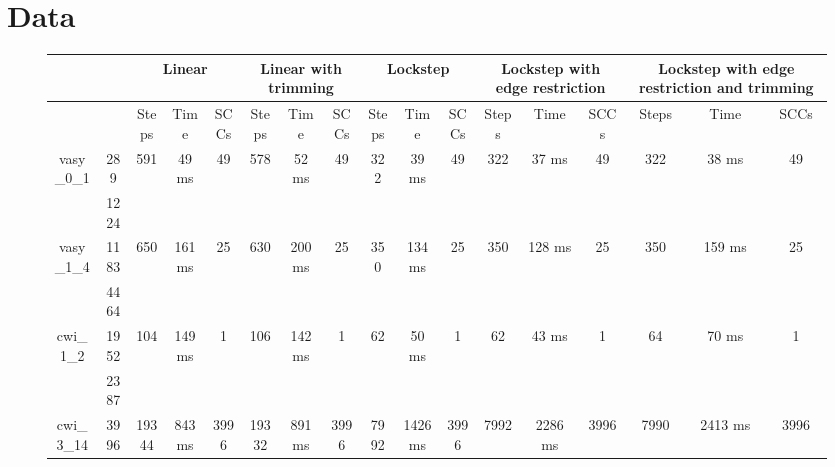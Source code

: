 \documentclass[../master/master.tex]{subfiles}
\begin{document}
\section{Data}
\begin{figure}
\centering
\begin{tabular}{ |c|c||c|c|c||c|c|c||c|c|c||c|c|c||c|c|c| } 
\hline
 \multicolumn{2}{|c||}{} & \multicolumn{3}{c||}{Linear} & \multicolumn{3}{c||}{Linear with trimming} & \multicolumn{3}{c||}{Lockstep} & \multicolumn{3}{c||}{Lockstep with edge restriction} & \multicolumn{3}{c||}{Lockstep with edge restriction and trimming}\\
\hline
\multicolumn{2}{|c||}{}& Steps & Time & SCCs& Steps & Time & SCCs& Steps & Time & SCCs& Steps & Time & SCCs& Steps & Time & SCCs\\
\hline
\multirow{2}{4em}{vasy\_0\_1} & 289 & \multirow{2}{4em}{591} & \multirow{2}{4em}{49 ms} & \multirow{2}{4em}{49} & \multirow{2}{4em}{578} & \multirow{2}{4em}{52 ms} & \multirow{2}{4em}{49} & \multirow{2}{4em}{322} & \multirow{2}{4em}{39 ms} & \multirow{2}{4em}{49} & \multirow{2}{4em}{322} & \multirow{2}{4em}{37 ms} & \multirow{2}{4em}{49} & \multirow{2}{4em}{322} & \multirow{2}{4em}{38 ms} & \multirow{2}{4em}{49} \\
\cline{2-2}
 & 1224  &  &  &  &  &  &  &  &  &  &  &  &  &  &  &  \\
\hline
\multirow{2}{4em}{vasy\_1\_4} & 1183 & \multirow{2}{4em}{650} & \multirow{2}{4em}{161 ms} & \multirow{2}{4em}{25} & \multirow{2}{4em}{630} & \multirow{2}{4em}{200 ms} & \multirow{2}{4em}{25} & \multirow{2}{4em}{350} & \multirow{2}{4em}{134 ms} & \multirow{2}{4em}{25} & \multirow{2}{4em}{350} & \multirow{2}{4em}{128 ms} & \multirow{2}{4em}{25} & \multirow{2}{4em}{350} & \multirow{2}{4em}{159 ms} & \multirow{2}{4em}{25} \\
\cline{2-2}
 & 4464  &  &  &  &  &  &  &  &  &  &  &  &  &  &  &  \\
\hline
\multirow{2}{4em}{cwi\_1\_2} & 1952 & \multirow{2}{4em}{104} & \multirow{2}{4em}{149 ms} & \multirow{2}{4em}{1} & \multirow{2}{4em}{106} & \multirow{2}{4em}{142 ms} & \multirow{2}{4em}{1} & \multirow{2}{4em}{62} & \multirow{2}{4em}{50 ms} & \multirow{2}{4em}{1} & \multirow{2}{4em}{62} & \multirow{2}{4em}{43 ms} & \multirow{2}{4em}{1} & \multirow{2}{4em}{64} & \multirow{2}{4em}{70 ms} & \multirow{2}{4em}{1} \\
\cline{2-2}
 & 2387  &  &  &  &  &  &  &  &  &  &  &  &  &  &  &  \\
\hline
\multirow{2}{4em}{cwi\_3\_14} & 3996 & \multirow{2}{4em}{19344} & \multirow{2}{4em}{843 ms} & \multirow{2}{4em}{3996} & \multirow{2}{4em}{19332} & \multirow{2}{4em}{891 ms} & \multirow{2}{4em}{3996} & \multirow{2}{4em}{7992} & \multirow{2}{4em}{1426 ms} & \multirow{2}{4em}{3996} & \multirow{2}{4em}{7992} & \multirow{2}{4em}{2286 ms} & \multirow{2}{4em}{3996} & \multirow{2}{4em}{7990} & \multirow{2}{4em}{2413 ms} & \multirow{2}{4em}{3996} \\

\end{tabular}
\end{figure}
\end{document}
